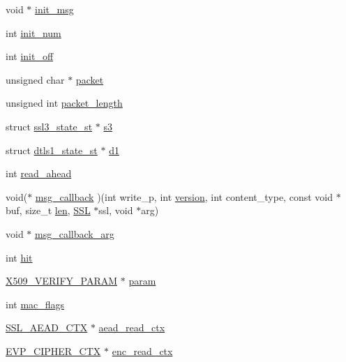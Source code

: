 \begin{DoxyCompactItemize}
\item 
void $\ast$ \hyperlink{structssl__st_a0d932f5ec1630a3cbd511548c3556a45}{init\+\_\+msg}
\item 
int \hyperlink{structssl__st_a5bdef1be2cab43e264edd98f162f7fff}{init\+\_\+num}
\item 
int \hyperlink{structssl__st_a828422d492ba318c1985327ca8a6f219}{init\+\_\+off}
\item 
unsigned char $\ast$ \hyperlink{structssl__st_a5b43e468488be2327eac1c4396b568bc}{packet}
\item 
unsigned int \hyperlink{structssl__st_ae52697ae4cfec851e2b0d2c5ccaa1df7}{packet\+\_\+length}
\item 
struct \hyperlink{structssl3__state__st}{ssl3\+\_\+state\+\_\+st} $\ast$ \hyperlink{structssl__st_a2e2d2f47c0ac86c4329cc8035b3e4688}{s3}
\item 
struct \hyperlink{structdtls1__state__st}{dtls1\+\_\+state\+\_\+st} $\ast$ \hyperlink{structssl__st_afd70ab79ea0917b56fa74a8cb04ddaca}{d1}
\item 
int \hyperlink{structssl__st_a6be4ea32cec16e0cfb2034f1d8fc3f37}{read\+\_\+ahead}
\item 
void($\ast$ \hyperlink{structssl__st_a0b5f95998bc3a4a4193adeca3b7b289a}{msg\+\_\+callback} )(int write\+\_\+p, int \hyperlink{structssl__st_a104b2a57e68e7e8c228c34d9ffb0e3dd}{version}, int content\+\_\+type, const void $\ast$buf, size\+\_\+t \hyperlink{x509_8h_ad8c3db4434e9cb5cd772cc009f40e856}{len}, \hyperlink{ossl__typ_8h_a71f21e09bf365489dab9d85bd4785e24}{S\+SL} $\ast$ssl, void $\ast$arg)
\item 
void $\ast$ \hyperlink{structssl__st_a265c0d1adbd1e76b1b326a1f82b0cfcf}{msg\+\_\+callback\+\_\+arg}
\item 
int \hyperlink{structssl__st_a20d2f2c7a00b1fd70c28c81c2d6f34c2}{hit}
\item 
\hyperlink{x509__vfy_8h_a9b8209a7a29bafa279e1b5bc5f81cb23}{X509\+\_\+\+V\+E\+R\+I\+F\+Y\+\_\+\+P\+A\+R\+AM} $\ast$ \hyperlink{structssl__st_a384d0d3915209d3d4c8144146bab78aa}{param}
\item 
int \hyperlink{structssl__st_a501b23b52ff9106b5cba654187324d95}{mac\+\_\+flags}
\item 
\hyperlink{ssl_8h_abe973b3da5b2abbf35e7db39ac109eeb}{S\+S\+L\+\_\+\+A\+E\+A\+D\+\_\+\+C\+TX} $\ast$ \hyperlink{structssl__st_a77fcdce69b8829739b8beaff484f6610}{aead\+\_\+read\+\_\+ctx}
\item 
\hyperlink{ossl__typ_8h_aab2bd6a044e1d31ebc2fe82b3b0b3d9a}{E\+V\+P\+\_\+\+C\+I\+P\+H\+E\+R\+\_\+\+C\+TX} $\ast$ \hyperlink{structssl__st_ae2efb2324ed8b45b65cc2a3aa5ac1a4d}{enc\+\_\+read\+\_\+ctx}

\end{DoxyCompactItemize}
